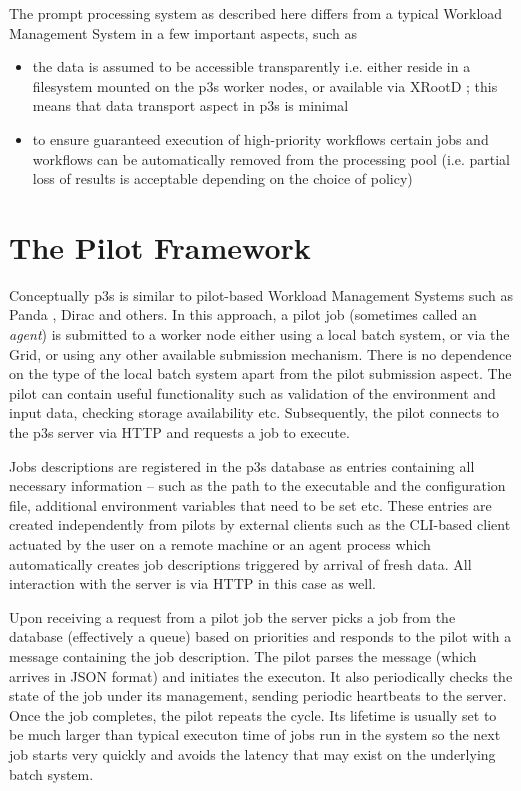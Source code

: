 \documentclass{PoS}
\begin{document}
\noindent The prompt processing system as described here differs from a typical Workload Management System in a few important
aspects, such as
\begin{itemize}
\item the data is assumed to be accessible transparently i.e. either reside in a filesystem mounted on the p3s worker nodes,
or available via XRootD \cite{xrootd}; this means that data transport aspect in p3s is minimal

\item to ensure guaranteed execution of high-priority workflows certain jobs and workflows can be automatically
removed from the processing pool (i.e. partial loss of results is acceptable depending on the choice of policy)

\end{itemize}

\section{The Pilot Framework}
Conceptually p3s is similar to pilot-based Workload Management Systems such as Panda \cite{panda}, Dirac \cite{dirac} and others.
In this approach, a pilot job (sometimes called an \textit{agent}) is submitted to a worker node either using a local batch system,
or via the Grid, or using any other available submission mechanism. There is no dependence on the type of the local batch system
apart from the pilot submission aspect. The pilot can contain useful functionality such as validation of the environment and input data,
checking storage availability etc. Subsequently, the pilot connects to the p3s server via HTTP and requests a job to execute.

Jobs descriptions are registered in the p3s database as entries containing all necessary information -- such as the path to the executable
and the configuration file, additional environment variables that need to be set etc. These entries are created independently from pilots by
external clients such as the CLI-based client actuated by the user on a remote machine or an agent process which automatically creates
job descriptions triggered by arrival of fresh data. All interaction with the server is via HTTP in this case as well.

Upon receiving a request from a pilot job the server picks a job from the database (effectively a queue) based on priorities
and responds to the pilot with a message containing the job description. The pilot parses the message (which arrives in JSON
format) and initiates the executon. It also periodically checks the state of the job under its management, sending periodic
heartbeats to the server. Once the job completes, the pilot repeats the cycle. Its lifetime is usually set to be much larger
than typical executon time of jobs run in the system so the next job starts very quickly and avoids the latency
that may exist on the underlying batch system.
\end{document}
